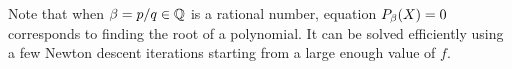 Note that when $\beta=p/q \in \mathbb{Q}$ is a rational number, equation $P_\beta(X)=0$ corresponds to finding the root of a polynomial. It can be solved efficiently using a few Newton descent iterations starting from a large enough value of $f$.





